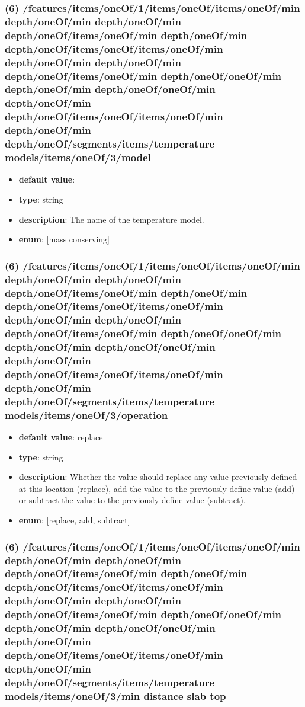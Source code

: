 \subsubsection{(6) /features/items/oneOf/1/items/oneOf/items/oneOf/min depth/oneOf/min depth/oneOf/min depth/oneOf/items/oneOf/min depth/oneOf/min depth/oneOf/items/oneOf/items/oneOf/min depth/oneOf/min depth/oneOf/min depth/oneOf/items/oneOf/min depth/oneOf/oneOf/min depth/oneOf/min depth/oneOf/oneOf/min depth/oneOf/min depth/oneOf/items/oneOf/items/oneOf/min depth/oneOf/min depth/oneOf/segments/items/temperature models/items/oneOf/3/model}
\begin{itemize}[leftmargin=6em]\item {\bf default value}: 
\item {\bf type}: string
\item {\bf description}: The name of the temperature model.
\item {\bf enum}: [mass conserving]\end{itemize}\subsubsection{(6) /features/items/oneOf/1/items/oneOf/items/oneOf/min depth/oneOf/min depth/oneOf/min depth/oneOf/items/oneOf/min depth/oneOf/min depth/oneOf/items/oneOf/items/oneOf/min depth/oneOf/min depth/oneOf/min depth/oneOf/items/oneOf/min depth/oneOf/oneOf/min depth/oneOf/min depth/oneOf/oneOf/min depth/oneOf/min depth/oneOf/items/oneOf/items/oneOf/min depth/oneOf/min depth/oneOf/segments/items/temperature models/items/oneOf/3/operation}
\begin{itemize}[leftmargin=6em]\item {\bf default value}: replace
\item {\bf type}: string
\item {\bf description}: Whether the value should replace any value previously defined at this location (replace), add the value to the previously define value (add) or subtract the value to the previously define value (subtract).
\item {\bf enum}: [replace, add, subtract]\end{itemize}\subsubsection{(6) /features/items/oneOf/1/items/oneOf/items/oneOf/min depth/oneOf/min depth/oneOf/min depth/oneOf/items/oneOf/min depth/oneOf/min depth/oneOf/items/oneOf/items/oneOf/min depth/oneOf/min depth/oneOf/min depth/oneOf/items/oneOf/min depth/oneOf/oneOf/min depth/oneOf/min depth/oneOf/oneOf/min depth/oneOf/min depth/oneOf/items/oneOf/items/oneOf/min depth/oneOf/min depth/oneOf/segments/items/temperature models/items/oneOf/3/min distance slab top}
